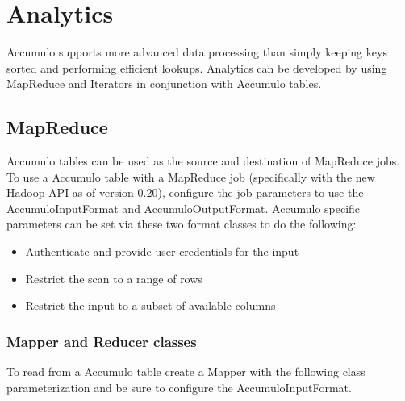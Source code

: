 
%
%

\chapter{Analytics}

Accumulo supports more advanced data processing than simply keeping keys
sorted and performing efficient lookups. Analytics can be developed by using
MapReduce and Iterators in conjunction with Accumulo tables.

\section{MapReduce}

Accumulo tables can be used as the source and destination of MapReduce jobs. To
use a Accumulo table with a MapReduce job (specifically with the new Hadoop API
as of version 0.20), configure the job parameters to use the AccumuloInputFormat
and AccumuloOutputFormat. Accumulo specific parameters can be set via these
two format classes to do the following:
\begin{itemize}
\item{Authenticate and provide user credentials for the input}
\item{Restrict the scan to a range of rows}
\item{Restrict the input to a subset of available columns}
\end{itemize}

\subsection{Mapper and Reducer classes}

To read from a Accumulo table create a Mapper with the following class
parameterization and be sure to configure the AccumuloInputFormat.

